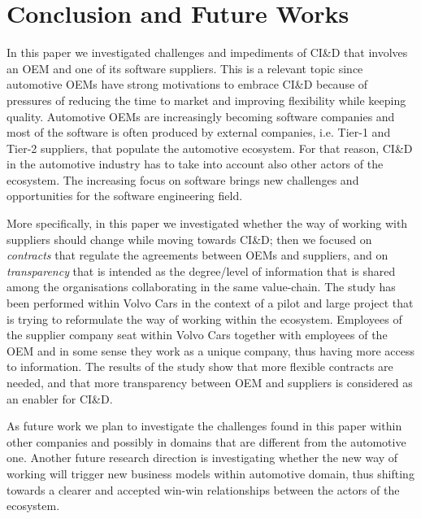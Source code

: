 \section{Conclusion and Future Works}\label{sec:conclusion}

In this paper we investigated challenges and impediments of CI\&D that involves an OEM and one of its software suppliers.
This is a relevant topic since automotive OEMs have strong motivations to embrace CI\&D because of pressures of reducing the time to market and improving flexibility while keeping quality. Automotive OEMs are increasingly becoming software companies and most of the software is often produced by external companies, i.e. Tier-1 and Tier-2 suppliers, that populate the automotive ecosystem. 
For that reason, CI\&D in the automotive industry has to take into account also other actors of the ecosystem.  The increasing focus on software brings new challenges and opportunities for the software engineering field. 

More specifically, in this paper we investigated whether the way of working with suppliers should change while moving towards  CI\&D; then we focused on {\em contracts} that regulate the agreements between OEMs and suppliers, and   
on {\em transparency} that is intended as the degree/level of information that is shared among the organisations collaborating in the same value-chain. %
The study has been performed within Volvo Cars in the context of a pilot and large project that is trying to reformulate the way of working within the ecosystem. Employees of the supplier company seat within Volvo Cars together with employees of the OEM and in some sense they work as a unique company, thus having more access to information. 
The results of the study show that more flexible contracts are needed, and that more transparency between OEM and suppliers is considered as an enabler for  CI\&D. 

As future work we plan to investigate the challenges found in this paper within other companies and possibly in domains that are different from the automotive one. Another future research direction is investigating whether the new way of working will trigger new business models within automotive domain, thus shifting towards a clearer and accepted win-win relationships between the actors of the ecosystem.